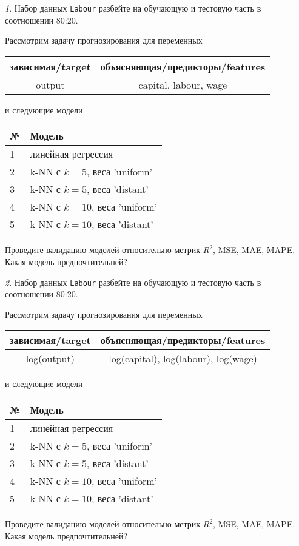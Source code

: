 \documentclass[12pt]{article}
\theoremstyle{remark}
\newtheorem{exercise}{}[section]
\begin{document}
\begin{exercise}
Набор данных \texttt{Labour} разбейте на обучающую и тестовую часть
в соотношении 80:20.

Рассмотрим задачу прогнозирования для переменных
\begin{center}
	\begin{tabular}{|c|c|}\hline
		зависимая/target & объясняющая/предикторы/features \\ \hline
		output & capital, labour, wage \\ \hline
	\end{tabular}
\end{center}
и следующие модели
\begin{center}
	\begin{tabular}{|l|l|}\hline
		№ & Модель \\ \hline
		1 & линейная регрессия\\
		2 & k-NN с \(k=5\), веса 'uniform' \\
		3 & k-NN с \(k=5\), веса 'distant' \\
		4 & k-NN с \(k=10\), веса 'uniform' \\
		5 & k-NN с \(k=10\), веса 'distant' \\ \hline
	\end{tabular}
\end{center}
Проведите валидацию моделей относительно метрик \(R^2\), MSE, MAE,
MAPE. Какая модель предпочтительней?
\end{exercise}

\begin{exercise}
Набор данных \texttt{Labour} разбейте на обучающую и тестовую часть
в соотношении 80:20.

Рассмотрим задачу прогнозирования для переменных
\begin{center}
	\begin{tabular}{|c|c|}\hline
		зависимая/target & объясняющая/предикторы/features \\ \hline
		log(output) & log(capital), log(labour), log(wage) \\ \hline
	\end{tabular}
\end{center}
и следующие модели
\begin{center}
	\begin{tabular}{|l|l|}\hline
		№ & Модель \\ \hline
		1 & линейная регрессия\\
		2 & k-NN с \(k=5\), веса 'uniform' \\
		3 & k-NN с \(k=5\), веса 'distant' \\
		4 & k-NN с \(k=10\), веса 'uniform' \\
		5 & k-NN с \(k=10\), веса 'distant' \\ \hline
	\end{tabular}
\end{center}
Проведите валидацию моделей относительно метрик \(R^2\), MSE, MAE,
MAPE. Какая модель предпочтительней?
\end{exercise}



\end{document}
